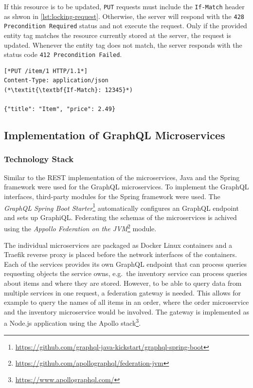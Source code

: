 If this resource is to be updated, \texttt{PUT} requests must include the \texttt{If-Match} header as shwon in \autoref{lst:locking-request}.
Otherwise, the server will respond with the \texttt{428 Precondition Required} status and not execute the request.
Only if the provided entity tag matches the resource currently stored at the server, the request is updated.
Whenever the entity tag does not match, the server responds with the status code \texttt{412 Precondition Failed}.

\begin{lstlisting}[caption={Request to Update Resources}, showlines=true, label=lst:locking-request, language=http]
[*PUT /item/1 HTTP/1.1*]
Content-Type: application/json
(*\textit{\textbf{If-Match}: 12345}*)

{"title": "Item", "price": 2.49}
\end{lstlisting}

\subsection{Implementation of GraphQL Microservices}

\subsubsection{Technology Stack}\label{sec:graphql-tech}

Similar to the \ac{REST} implementation of the microservices, Java and the Spring framework were used for the GraphQL microservices.
To implement the GraphQL interfaces, third-party modules for the Spring framework were used.
The \textit{GraphQL Spring Boot Starter}\footnote{\url{https://github.com/graphql-java-kickstart/graphql-spring-boot}} automatically configures an GraphQL endpoint and sets up GraphiQL.%
Federating the schemas of the microservices is achived using the \textit{Appollo Federation on the \acs{JVM}}\footnote{\url{https://github.com/apollographql/federation-jvm}} module.

The individual microservices are packaged as Docker Linux containers and a Traefik reverse proxy is placed before the network interfaces of the containers.
Each of the services provides its own GraphQL endpoint that can process queries requesting objects the service owns, e.g.~the inventory service can process queries about items and where they are stored.
However, to be able to query data from multiple services in one request, a federation gateway is needed.
This allows for example to query the names of all items in an order, where the order microservice and the inventory microservice would be involved.
The gateway is implemented as a Node.js application using the Apollo stack\footnote{\url{https://www.apollographql.com/}}.

